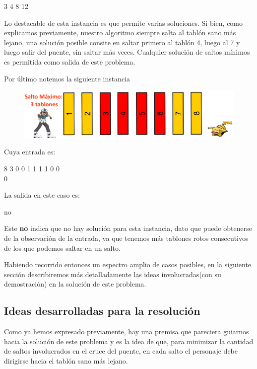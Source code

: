 \begin{addmargin}[4em]{0em}
\textsf{3 4 8 12} \\
\end{addmargin}

Lo destacable de esta instancia es que permite varias soluciones. Si bien, como explicamos previamente, nuestro algoritmo siempre salta al tablón sano más lejano, una solución posible consite en saltar primero al tablón 4, luego al 7 y luego salir del puente, sin saltar más veces. Cualquier solución de saltos mínimos es permitida como salida de este problema.

Por último notemos la siguiente instancia

\begin{figure}[H]
\centering
\includegraphics[scale=0.5]{ej1/tabl_2.png}
\end{figure}

Cuya entrada es: 
\begin{addmargin}[4em]{0em}
\textsf{8 3 0 0 1 1 1 1 0 0} \\
\textsf{0}
\end{addmargin}

La salida en este caso es:

\begin{addmargin}[4em]{0em}
\textsf{no} \\
\end{addmargin}

Este \textbf{no} indica que no hay solución para esta instancia, dato que puede obtenerse de la observación de la entrada, ya que tenemos más tablones rotos consecutivos de los que podemos saltar en un salto.

Habiendo recorrido entonces un espectro amplio de casos posibles, en la siguiente sección describiremos más detalladamente las ideas involucradas(con su demostración) en la solución de este problema.

\subsection{Ideas desarrolladas para la resoluci\'on}

Como ya hemos expresado previamente, hay una premisa que pareciera guiarnos hacia la solución de este problema y es la idea de que, para minimizar la cantidad de saltos involucrados en el cruce del puente, en cada salto el personaje debe dirigirse hacia el tablón sano más lejano. 

